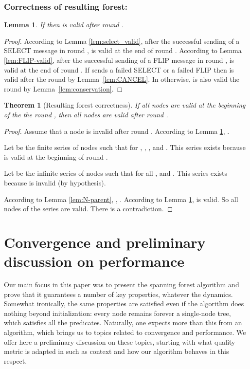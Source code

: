 \documentclass[twocolumn]{article}
\newtheorem{lemma}{Lemma}
\newtheorem{theorem}{Theorem}
\newcommand{\depends}[1]{}
\begin{document}
\subsubsection{Correctness of resulting forest:}

\begin{lemma}
\label{lem:T-vald}
If  then  is valid after round . 
\depends{  \ref{lem:CANCEL}, \ref{lem:FLIP-valid}, \ref{lem:conservation}, \ref{lem:select_valid}}
\end{lemma}
\begin{proof}
According to Lemma \ref{lem:select_valid}, after the successful sending of a SELECT message in round ,  is valid at the end of round . 
According to Lemma \ref{lem:FLIP-valid}, after the successful sending of a FLIP message in round ,  is valid at the end of round . 
If  sends a failed SELECT or a failed FLIP then  is valid after the round by Lemma~\ref{lem:CANCEL}.
In otherwise,  is also valid the round by Lemma~\ref{lem:conservation}.

 \end{proof}


\begin{theorem}[Resulting forest correctness]
  \label{lem:nodes_validity}
  If all nodes are valid at the beginning of the the round , then 
all nodes are valid after round .
\depends{ \ref{lem:T-vald}, \ref{lem:N-parent} }
\end{theorem}
\begin{proof}

Assume that  a node  is invalid after round .
According to Lemma \ref{lem:T-vald}, .

Let  be the finite series of nodes such 
that for ,
, , and .
This series exists because  is valid at the beginning of round .

Let  be the infinite series of nodes such 
that for all 
,  and 
. 
This series exists because  is invalid (by hypothesis).

According to Lemma \ref{lem:N-parent}, , .
According to Lemma \ref{lem:T-vald},  is valid.
So all nodes of the series  are valid.
There is a contradiction.
 \end{proof}


\section{Convergence and preliminary discussion on performance}
\label{sec:simulation}

Our main focus in this paper was to present the spanning forest algorithm and prove that it guarantees a number of key properties, whatever the dynamics. Somewhat ironically, the same properties are satisfied even if the algorithm does nothing beyond initialization: every node remains forever a single-node tree, which satisfies all the predicates. Naturally, one expects more than this from an algorithm, which brings us to topics related to convergence and performance. We offer here a preliminary discussion on these topics, starting with what quality metric is adapted in such as context and how our algorithm behaves in this respect.
\end{document}
